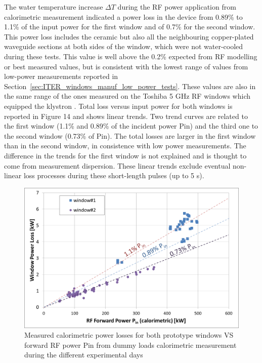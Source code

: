 The water temperature increase $\Delta T$ during the RF power application from calorimetric measurement indicated a power loss in the device from 0.89\% to 1.1\% of the input power for the first window and of 0.7\% for the second window. This power loss includes the ceramic but also all the neighbouring copper-plated waveguide sections at both sides of the window, which were not water-cooled during these tests. This value is well above the 0.2\% expected from RF modelling or best measured values, but is consistent with the lowest range of values from low-power measurements reported in Section~\ref{sec:ITER_windows_manuf_low_power_tests}. These values are also in the same range of the ones measured on the Toshiba 5 GHz RF windows which equipped the klystron . Total loss versus input power for both windows is reported in Figure 14 and shows linear trends. Two trend curves are related to the first window (1.1\% and 0.89\% of the incident power Pin) and the third one to the second window (0.73\% of Pin). The total losses are larger in the first window than in the second window, in consistence with low power measurements. The difference in the trends for the first window is not explained and is thought to come from measurement dispersion. These linear trends exclude eventual non-linear loss processes during these short-length pulses (up to 5 s). 

\begin{figure}
	\centering
	\includegraphics[width=1.0\linewidth]{figures/chap3/ITER_window/ITER_windows_power_loss}
	\caption{Measured calorimetric power losses for both prototype windows VS forward RF power Pin from dummy loads calorimetric measurement during the different experimental days}
	\label{fig:iterwindowspowerloss}
\end{figure}

